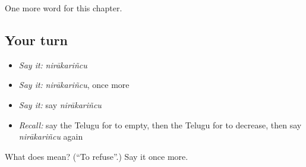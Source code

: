 \begin{grammarlens}[title={What you've built}]
One more word for this chapter.
\end{grammarlens}

\subsection*{Your turn}
\begin{itemize}
\raggedright
  \item \emph{Say it:} \emph{nirākariñcu}
  \item \emph{Say it:} \emph{nirākariñcu}, once more
  \item \emph{Say it:} say \emph{nirākariñcu}
  \item \emph{Recall:} say the Telugu for to empty, then the Telugu for to decrease, then say \emph{nirākariñcu} again
\end{itemize}

\begin{tcolorbox}[breakable,colback=teal!4,colframe=teal!35!black,title={Before you move on}]
What does  mean? (\textquotedblleft{}To refuse\textquotedblright{}.) Say it once more.
\end{tcolorbox}
